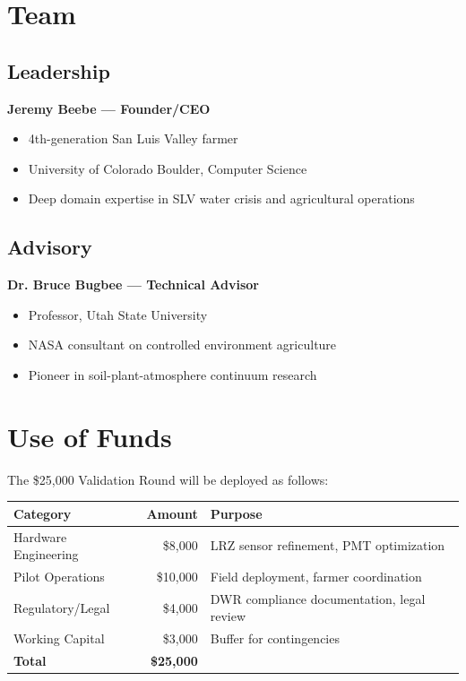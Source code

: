 \documentclass[10pt]{article}
\begin{document}
\newpage

\section{Team}

\subsection{Leadership}

\textbf{Jeremy Beebe — Founder/CEO}
\begin{itemize}
    \item 4th-generation San Luis Valley farmer
    \item University of Colorado Boulder, Computer Science
    \item Deep domain expertise in SLV water crisis and agricultural operations
\end{itemize}

\subsection{Advisory}

\textbf{Dr. Bruce Bugbee — Technical Advisor}
\begin{itemize}
    \item Professor, Utah State University
    \item NASA consultant on controlled environment agriculture
    \item Pioneer in soil-plant-atmosphere continuum research
\end{itemize}

\newpage

\section{Use of Funds}

The \$25,000 Validation Round will be deployed as follows:

\begin{table}[h]
\centering
\begin{tabular}{@{}lrl@{}}
\toprule
\textbf{Category} & \textbf{Amount} & \textbf{Purpose} \\
\midrule
Hardware Engineering & \$8,000 & LRZ sensor refinement, PMT optimization \\
Pilot Operations & \$10,000 & Field deployment, farmer coordination \\
Regulatory/Legal & \$4,000 & DWR compliance documentation, legal review \\
Working Capital & \$3,000 & Buffer for contingencies \\
\midrule
\textbf{Total} & \textbf{\$25,000} & \\
\bottomrule
\end{tabular}
\end{table}
\end{document}
